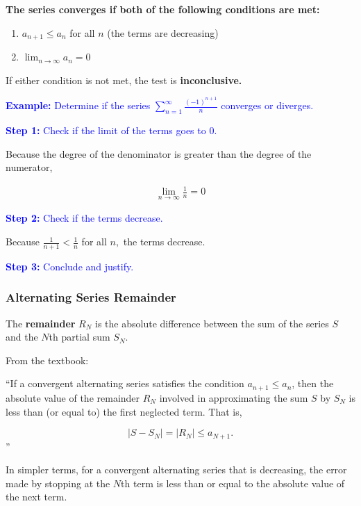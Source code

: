 \documentclass[letterpaper, 12pt]{article}
\newcommand{\example}[1]{\textcolor{blue}{\textbf{Example:} #1}}
\newcommand{\step}[2]{\textcolor{blue}{\textbf{Step #1:} #2}}
\begin{document}
\textbf{The series converges if both of the following conditions are met:}

\begin{enumerate}[label=(\alph*)]
    \item $\displaystyle a_{n+1} \leq a_n$ for all $n$ (the terms are decreasing)
    \item $\displaystyle \lim_{n \to \infty} a_n = 0$
    
\end{enumerate}

If either condition is not met, the test is \textbf{inconclusive.}

\example{Determine if the series $\displaystyle \sum_{n=1}^\infty \frac{(-1)^{n+1}}{n}$ converges or diverges.}

\step{1}{Check if the limit of the terms goes to 0.}

Because the degree of the denominator is greater than the degree of the numerator,

\begin{gather*}
\lim_{n \to \infty} \frac{1}{n} = 0
\end{gather*}

\step{2}{Check if the terms decrease.}

Because $\displaystyle \frac{1}{n+1} < \frac{1}{n}$ for all $n,$ the terms decrease.

\step{3}{Conclude and justify.}


\subsubsection*{Alternating Series Remainder}

The \textbf{remainder} $R_N$ is the absolute difference between the sum of the series $S$ and the $N$th partial sum $S_N$.

From the textbook:

``If a convergent alternating series satisfies the condition $a_{n+1} \leq a_n$, then the absolute value of the remainder $R_N$ involved in approximating the sum $S$ by $S_N$ is less than (or equal to) the first neglected term. That is,

$$|S-S_N| = |R_N| \leq a_{N+1}.$$''

In simpler terms, for a convergent alternating series that is decreasing, the error made by stopping at the $N$th term is less than or equal to the absolute value of the next term.
\end{document}
